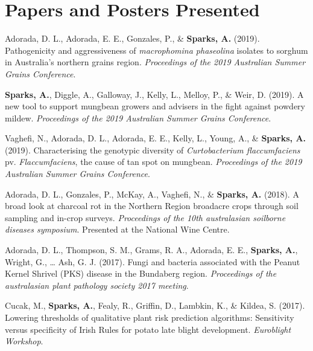 \documentclass[11pt, a4paper]{awesome-cv}
\begin{document}
\endgroup

\hypertarget{papers-and-posters-presented}{%
\section{Papers and Posters Presented}\label{papers-and-posters-presented}}

\begingroup
\setlength{\parindent}{-0.5in}
\setlength{\leftskip}{0.5in}

\hypertarget{refs_proceedings}{}
\leavevmode\hypertarget{ref-Adorada2019}{}%
Adorada, D. L., Adorada, E. E., Gonzales, P., \& \textbf{Sparks, A.} (2019). Pathogenicity and aggressiveness of \emph{macrophomina phaseolina} isolates to sorghum in Australia's northern grains region. \emph{Proceedings of the 2019 Australian Summer Grains Conference}.

\leavevmode\hypertarget{ref-Sparks2019ASGC}{}%
\textbf{Sparks, A.}, Diggle, A., Galloway, J., Kelly, L., Melloy, P., \& Weir, D. (2019). A new tool to support mungbean growers and advisers in the fight against powdery mildew. \emph{Proceedings of the 2019 Australian Summer Grains Conference}.

\leavevmode\hypertarget{ref-Vaghefi2019}{}%
Vaghefi, N., Adorada, D. L., Adorada, E. E., Kelly, L., Young, A., \& \textbf{Sparks, A.} (2019). Characterising the genotypic diversity of \emph{Curtobacterium flaccumfaciens} pv. \emph{Flaccumfaciens}, the cause of tan spot on mungbean. \emph{Proceedings of the 2019 Australian Summer Grains Conference}.

\leavevmode\hypertarget{ref-Adorada2018}{}%
Adorada, D. L., Gonzales, P., McKay, A., Vaghefi, N., \& \textbf{Sparks, A.} (2018). A broad look at charcoal rot in the Northern Region broadacre crops through soil sampling and in-crop surveys. \emph{Proceedings of the 10th australasian soilborne diseases symposium}. Presented at the National Wine Centre.

\leavevmode\hypertarget{ref-Adorada2017}{}%
Adorada, D. L., Thompson, S. M., Grams, R. A., Adorada, E. E., \textbf{Sparks, A.}, Wright, G., \ldots{} Ash, G. J. (2017). Fungi and bacteria associated with the Peanut Kernel Shrivel (PKS) disease in the Bundaberg region. \emph{Proceedings of the australasian plant pathology society 2017 meeting}.

\leavevmode\hypertarget{ref-Cucak2017}{}%
Cucak, M., \textbf{Sparks, A.}, Fealy, R., Griffin, D., Lambkin, K., \& Kildea, S. (2017). Lowering thresholds of qualitative plant risk prediction algorithms: Sensitivity versus specificity of Irish Rules for potato late blight development. \emph{Euroblight Workshop}.
\end{document}
